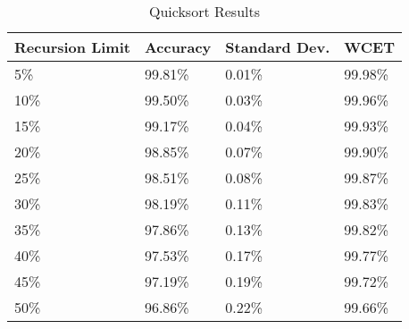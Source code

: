 \begin{table}[]
  \centering
  \caption{Quicksort Results}
  \label{quicksortT}
  \begin{tabular}{|l|l|l|l|}
    \hline
    \textbf{Recursion Limit} & \textbf{Accuracy}  & \textbf{Standard Dev.}  & \textbf{WCET}           \\ \hline
5\% &  99.81\% &0.01\% &99.98\%   \\ \hline
10\% &  99.50\% &0.03\% &99.96\%   \\ \hline
15\% &  99.17\% &0.04\% &99.93\%   \\ \hline
20\% &  98.85\% &0.07\% &99.90\%   \\ \hline
25\% &  98.51\% &0.08\% &99.87\%   \\ \hline
30\% &  98.19\% &0.11\% &99.83\%   \\ \hline
35\% &  97.86\% &0.13\% &99.82\%   \\ \hline
40\% &  97.53\% &0.17\% &99.77\%   \\ \hline
45\% &  97.19\% &0.19\% &99.72\%   \\ \hline
50\% &  96.86\% &0.22\% &99.66\%   \\ \hline
  \end{tabular}
\end{table}
